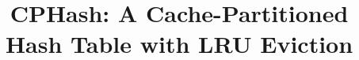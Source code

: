 \documentclass[10pt,twocolumn]{article}
\begin{document}
\newcommand{\cphash}{{\sc CPHash}}
\newcommand{\cpserver}{{\sc CPServer}}
\newcommand{\lockhash}{{\sc LockHash}}
\newcommand{\lockserver}{{\sc LockServer}}
\newcommand{\memcached}{{\sc Memcached}}

\title{\cphash: A Cache-Partitioned Hash Table with LRU Eviction}
\author{}
\date{}
\maketitle











\end{document}
